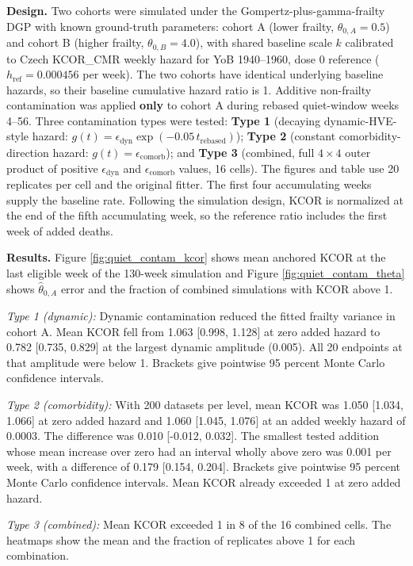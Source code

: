 \documentclass[
]{article}
\begin{document}
\textbf{Design.} Two cohorts were simulated under the Gompertz-plus-gamma-frailty DGP with known ground-truth parameters: cohort A (lower frailty, \(\theta_{0,A}=0.5\)) and cohort B (higher frailty, \(\theta_{0,B}=4.0\)), with shared baseline scale \(k\) calibrated to Czech KCOR\_CMR weekly hazard for YoB 1940--1960, dose 0 reference (\(h_{\mathrm{ref}}=0.000456\) per week). The two cohorts have identical underlying baseline hazards, so their baseline cumulative hazard ratio is 1. Additive non-frailty contamination was applied \textbf{only} to cohort A during rebased quiet-window weeks 4--56. Three contamination types were tested: \textbf{Type 1} (decaying dynamic-HVE-style hazard: \(g(t)=\epsilon_{\mathrm{dyn}}\exp(-0.05\,t_{\mathrm{rebased}})\)); \textbf{Type 2} (constant comorbidity-direction hazard: \(g(t)=\epsilon_{\mathrm{comorb}}\)); and \textbf{Type 3} (combined, full \(4\times4\) outer product of positive \(\epsilon_{\mathrm{dyn}}\) and \(\epsilon_{\mathrm{comorb}}\) values, 16 cells). The figures and table use 20 replicates per cell and the original fitter. The first four accumulating weeks supply the baseline rate. Following the simulation design, KCOR is normalized at the end of the fifth accumulating week, so the reference ratio includes the first week of added deaths.

\textbf{Results.} Figure \ref{fig:quiet_contam_kcor} shows mean anchored KCOR at the last eligible week of the 130-week simulation and Figure \ref{fig:quiet_contam_theta} shows \(\hat\theta_{0,A}\) error and the fraction of combined simulations with KCOR above 1.

\emph{Type 1 (dynamic):} Dynamic contamination reduced the fitted frailty variance in cohort A. Mean KCOR fell from 1.063 {[}0.998, 1.128{]} at zero added hazard to 0.782 {[}0.735, 0.829{]} at the largest dynamic amplitude (0.005). All 20 endpoints at that amplitude were below 1. Brackets give pointwise 95 percent Monte Carlo confidence intervals.

\emph{Type 2 (comorbidity):} With 200 datasets per level, mean KCOR was 1.050 {[}1.034, 1.066{]} at zero added hazard and 1.060 {[}1.045, 1.076{]} at an added weekly hazard of 0.0003. The difference was 0.010 {[}-0.012, 0.032{]}. The smallest tested addition whose mean increase over zero had an interval wholly above zero was 0.001 per week, with a difference of 0.179 {[}0.154, 0.204{]}. Brackets give pointwise 95 percent Monte Carlo confidence intervals. Mean KCOR already exceeded 1 at zero added hazard.

\emph{Type 3 (combined):} Mean KCOR exceeded 1 in 8 of the 16 combined cells. The heatmaps show the mean and the fraction of replicates above 1 for each combination.
\end{document}
